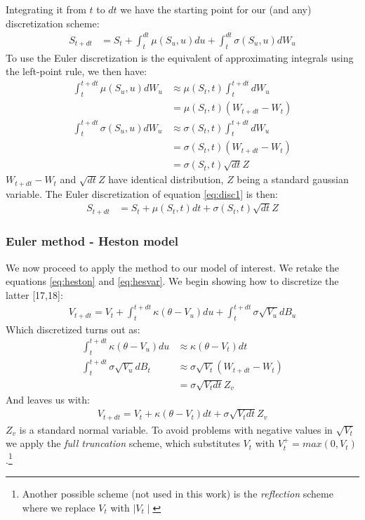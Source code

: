 \documentclass[12pt,twoside]{reedthesis}
\theoremstyle{definition}
\theoremstyle{definition}
\theoremstyle{remark}
\begin{document}
  Integrating it from \(t\) to \(dt\) we have the starting point for our
  (and any) discretization scheme:
  \begin{align}
  \label{eq:disc1}
  S_{t+dt} &= S_t + \int_{t}^{dt}{\mu(S_u,u)}du + \int_{t}^{dt}{\sigma(S_u,u)} dW_u
  \end{align}
  To use the Euler discretization is the equivalent of approximating
  integrals using the left-point rule, we then have:
  \begin{align*}
   \int_{t}^{t+dt}{\mu(S_u,u)} dW_u &\approx \mu(S_t,t) \int_{t}^{t+dt}dW_u\\
  &= \mu(S_t,t) (W_{t+dt} - W_t)  \\
   \int_{t}^{t+dt}{\sigma(S_u,u)} dW_u &\approx \sigma(S_t,t) \int_{t}^{t+dt}dW_u\\
  &= \sigma(S_t,t) (W_{t+dt} - W_t)  \\
  &= \sigma(S_t,t) \sqrt{dt} Z
  \end{align*}
  \(W_{t+dt}-W_t\) and \(\sqrt{dt}Z\) have identical distribution, \(Z\)
  being a standard gaussian variable. The Euler discretization of equation
  \eqref{eq:disc1} is then:
  \begin{align}
  \label{eq:disc2}
  S_{t+dt} &= S_t + \mu(S_t,t)dt + \sigma(S_t,t)\sqrt{dt}Z
  \end{align}
  \subsubsection{Euler method - Heston
  model}\label{euler-method---heston-model}
  
  We now proceed to apply the method to our model of interest. We retake
  the equations \eqref{eq:heston} and \eqref{eq:hesvar}. We begin showing how
  to discretize the latter {[}17,18{]}:
  \begin{align}
  \label{eq:hesvareuler}
  V_{t+dt} = V_t+ \int_{t}^{t+dt}{\kappa (\theta - V_u) du} + \int_{t}^{t+dt}{\sigma \sqrt{V_u} dB_u}
  \end{align}
  Which discretized turns out as:
  \begin{align*}
   \int_{t}^{t+dt}{\kappa (\theta - V_u)} du &\approx \kappa (\theta - V_t) dt\\
   \int_{t}^{t+dt}{\sigma \sqrt{V_u}} dB_t &\approx \sigma \sqrt{V_t} (W_{t+dt}-W_t)\\
  &= \sigma \sqrt{V_t dt} Z_v
  \end{align*}
  And leaves us with:
  \begin{align}
  V_{t+dt} = V_t + \kappa (\theta - V_t) dt + \sigma \sqrt{V_t dt} Z_v
  \end{align}
  \(Z_v\) is a standard normal variable. To avoid problems with negative
  values in \(\sqrt{V_t}\) we apply the \emph{full truncation} scheme,
  which substitutes \(V_t\) with \(V_t^+ = max(0, V_t)\).\footnote{Another
    possible scheme (not used in this work) is the \emph{reflection}
    scheme where we replace \(V_t\) with \(\mid V_t \mid\)}
  
\end{document}
